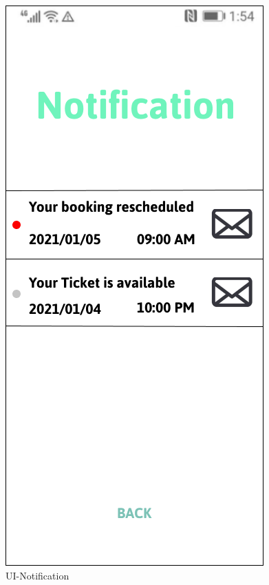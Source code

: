 \documentclass[a4paper,12pt]{report}
\begin{document}
\begin{figure}[H]
\begin{minipage}[t]{0.56\linewidth}
		\includegraphics[scale=0.5]{UI-Notification.png}
		\caption{UI-Notification}
		\label{fig:UI-Notification}
	\end{minipage}
\end{figure}
\end{document}
